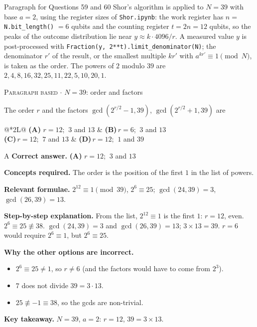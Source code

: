 \documentclass[11pt,a4paper]{article}
\newcommand{\optlabel}[1]{\textbf{(#1)}}
\newcommand{\correctlabel}[1]{\textcolor{okgreen}{\textbf{(#1)}\,\ding{51}}}
\newenvironment{qitem}[1]{\begin{list}{}{\setlength{\leftmargin}{3.3em}\setlength{\labelwidth}{3.1em}%
  \setlength{\labelsep}{0.2em}\setlength{\topsep}{3pt}\setlength{\parsep}{3pt}}\item[\textbf{Q.#1}\hfill]}{\end{list}}
\newcommand{\qsep}{\par\vspace{2pt}{\color{black!15}\hrule}\vspace{4pt}}
\newcommand{\qmeta}[2]{{\footnotesize\color{black!60}\textsc{#1} \;$\cdot$\; #2}\par}
\begin{document}
\begin{passagebox}{Paragraph for Questions 59 and 60}
Shor's algorithm is applied to $N = 39$ with base $a = 2$, using the register sizes of \texttt{Shor.ipynb}: the work register has
$n = $ \texttt{N.bit\_length()} $= 6$ qubits and the counting register $t = 2n = 12$ qubits, so the peaks of the outcome distribution lie near
$y \approx k\cdot4096/r$. A measured value $y$ is post-processed with \texttt{Fraction(y, 2**t).limit\_denominator(N)}; the denominator $r'$ of the
result, or the smallest multiple $kr'$ with $a^{kr'} \equiv 1 \pmod N$, is taken as the order. The powers of $2$ modulo $39$ are
$2, 4, 8, 16, 32, 25, 11, 22, 5, 10, 20, 1$.
\end{passagebox}
\begin{qitem}{59}
\qmeta{Paragraph based}{$N = 39$: order and factors}
The order $r$ and the factors $\gcd(2^{r/2} - 1, 39)$, $\gcd(2^{r/2} + 1, 39)$ are
\par\smallskip\noindent\begin{tabularx}{\linewidth}{@{}*{2}{L}@{}}
\correctlabel{A}\,$r = 12$; $\ 3$ and $13$ & \optlabel{B}\,$r = 6$; $\ 3$ and $13$ \\[3pt]
\optlabel{C}\,$r = 12$; $\ 7$ and $13$ & \optlabel{D}\,$r = 12$; $\ 1$ and $39$
\end{tabularx}
\end{qitem}
\begin{solbox}{A}
\textbf{\color{brand}Correct answer.} \textcolor{okgreen}{\textbf{(A)}} $r = 12$; $\ 3$ and $13$

\textbf{\color{brand}Concepts required.} The order is the position of the first $1$ in the list of powers.

\textbf{\color{brand}Relevant formulae.} $2^{12} \equiv 1 \pmod{39}$, $2^6 \equiv 25$; $\gcd(24, 39) = 3$, $\gcd(26, 39) = 13$.

\textbf{\color{brand}Step-by-step explanation.} From the list, $2^{12} \equiv 1$ is the first $1$: $r = 12$, even. $2^6 \equiv 25 \not\equiv 38$. $\gcd(24, 39) = 3$ and $\gcd(26, 39) = 13$; $3\times13 = 39$.
$r = 6$ would require $2^6 \equiv 1$, but $2^6 \equiv 25$.

\textbf{\color{brand}Why the other options are incorrect.}
\begin{itemize}[leftmargin=2.4em, itemsep=1pt, topsep=2pt]
\item[\textbf{(B)}] $2^6 \equiv 25 \ne 1$, so $r \ne 6$ (and the factors would have to come from $2^3$).
\item[\textbf{(C)}] $7$ does not divide $39 = 3\cdot13$.
\item[\textbf{(D)}] $25 \not\equiv -1 \equiv 38$, so the gcds are non-trivial.
\end{itemize}
\textbf{\color{brand}Key takeaway.} $N = 39$, $a = 2$: $r = 12$, $39 = 3 \times 13$.
\end{solbox}
\qsep
\end{document}
